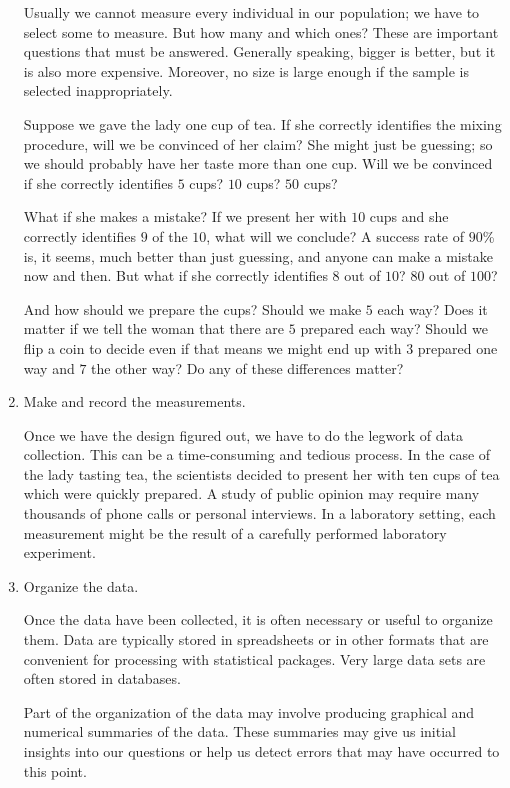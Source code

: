 \documentclass[twoside]{book}
\begin{document}
\begin{enumerate}
	Usually we cannot measure every individual in our population; we have 
	to select some to measure.  
	But how many and which ones?  
	These are important questions that must be answered.
	Generally speaking, bigger is better, but it is also more expensive.
	Moreover, no size is large enough if the sample is selected inappropriately.

	Suppose we gave the lady one cup of tea.  If she correctly identifies
	the mixing procedure, will we be convinced of her claim?  She might just
	be guessing; so we should probably have her taste more than one 
	cup.  Will we be convinced if she correctly identifies $5$ cups? $10$ cups?
	$50$ cups?

	What if she makes a mistake?  If we present her with $10$ cups and she
	correctly identifies $9$ of the $10$, what will we conclude?  
	A success rate of $90$\% is, it seems,
	much better than just guessing, and anyone can make a mistake now and then.
	But what if she correctly identifies $8$ out of $10$? $80$ out of $100$?
	
	And how should we prepare the cups?  Should we make $5$ each way?  
	Does it matter if we tell the woman that there are $5$ prepared 
	each way?
	Should we flip a coin to decide even if that means we might end 
	up with $3$ prepared one way and $7$ the other way?  
	Do any of these differences matter?

  \item
	Make and record the measurements.

	Once we have the design figured out, we have to do the legwork of 
	data collection.  This can be a time-consuming and tedious process.
	In the case of the lady tasting tea, the scientists decided to 
	present her with ten cups of tea which were quickly prepared.
	A study of public opinion may require many thousands of phone calls or 
	personal interviews.
	In a laboratory setting, each measurement might be the result 
	of a carefully performed laboratory experiment.

  \item Organize the data.

	Once the data have been collected, it is often necessary or useful
	to organize them.  Data are typically stored in spreadsheets or 
	in other formats that are convenient for processing with 
	statistical packages.  Very large data sets are often stored in 
	databases.  
	
	Part of the organization of the data may involve producing graphical and
	numerical summaries of the data.  These summaries may give us initial
	insights into our questions or help us detect errors that may have occurred
	to this point.


\end{enumerate}
\end{document}
